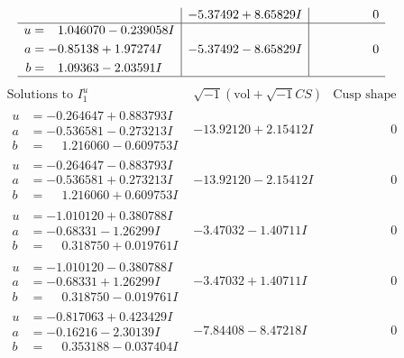 \documentclass[1p]{elsarticle_modified}
\theoremstyle{definition}
\newcommand{\I}{\sqrt{-1}}
\begin{document}
$$\begin{array}{c|c|c}
 & -5.37492 + 8.65829 I & \phantom{-0.000000 } 0 \\ \hline\begin{aligned}
u &= \phantom{-}1.046070 - 0.239058 I \\
a &= -0.85138 + 1.97274 I \\
b &= \phantom{-}1.09363 - 2.03591 I\end{aligned}
 & -5.37492 - 8.65829 I & \phantom{-0.000000 } 0\\
 \hline 
 \end{array}$$\newpage$$\begin{array}{c|c|c}  
\text{Solutions to }I^u_{1}& \I (\text{vol} + \sqrt{-1}CS) & \text{Cusp shape}\\
 \hline 
\begin{aligned}
u &= -0.264647 + 0.883793 I \\
a &= -0.536581 - 0.273213 I \\
b &= \phantom{-}1.216060 - 0.609753 I\end{aligned}
 & -13.92120 + 2.15412 I & \phantom{-0.000000 } 0 \\ \hline\begin{aligned}
u &= -0.264647 - 0.883793 I \\
a &= -0.536581 + 0.273213 I \\
b &= \phantom{-}1.216060 + 0.609753 I\end{aligned}
 & -13.92120 - 2.15412 I & \phantom{-0.000000 } 0 \\ \hline\begin{aligned}
u &= -1.010120 + 0.380788 I \\
a &= -0.68331 - 1.26299 I \\
b &= \phantom{-}0.318750 + 0.019761 I\end{aligned}
 & -3.47032 - 1.40711 I & \phantom{-0.000000 } 0 \\ \hline\begin{aligned}
u &= -1.010120 - 0.380788 I \\
a &= -0.68331 + 1.26299 I \\
b &= \phantom{-}0.318750 - 0.019761 I\end{aligned}
 & -3.47032 + 1.40711 I & \phantom{-0.000000 } 0 \\ \hline\begin{aligned}
u &= -0.817063 + 0.423429 I \\
a &= -0.16216 - 2.30139 I \\
b &= \phantom{-}0.353188 - 0.037404 I\end{aligned}
 & -7.84408 - 8.47218 I & \phantom{-0.000000 } 0 \\ \hline\begin{aligned}

\end{aligned}
\end{array}$$
\end{document}

